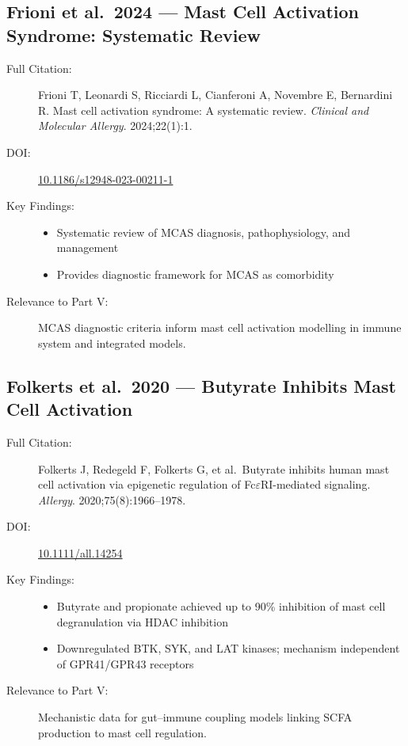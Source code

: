 \subsection{Frioni et al.\ 2024 --- Mast Cell Activation Syndrome: Systematic Review}

\begin{description}
    \item[Full Citation:] Frioni T, Leonardi S, Ricciardi L, Cianferoni A, Novembre E, Bernardini R. Mast cell activation syndrome: A systematic review. \textit{Clinical and Molecular Allergy}. 2024;22(1):1. \cite{Frioni2024MCAS}
    \item[DOI:] \href{https://doi.org/10.1186/s12948-023-00211-1}{10.1186/s12948-023-00211-1}
    \item[Key Findings:]
    \begin{itemize}
        \item Systematic review of MCAS diagnosis, pathophysiology, and management
        \item Provides diagnostic framework for MCAS as comorbidity
    \end{itemize}
    \item[Relevance to Part V:] MCAS diagnostic criteria inform mast cell activation modelling in immune system and integrated models.
\end{description}

\subsection{Folkerts et al.\ 2020 --- Butyrate Inhibits Mast Cell Activation}

\begin{description}
    \item[Full Citation:] Folkerts J, Redegeld F, Folkerts G, et al.\ Butyrate inhibits human mast cell activation via epigenetic regulation of Fc$\varepsilon$RI-mediated signaling. \textit{Allergy}. 2020;75(8):1966--1978. \cite{Folkerts2020butyrate}
    \item[DOI:] \href{https://doi.org/10.1111/all.14254}{10.1111/all.14254}
    \item[Key Findings:]
    \begin{itemize}
        \item Butyrate and propionate achieved up to 90\% inhibition of mast cell degranulation via HDAC inhibition
        \item Downregulated BTK, SYK, and LAT kinases; mechanism independent of GPR41/GPR43 receptors
    \end{itemize}
    \item[Relevance to Part V:] Mechanistic data for gut--immune coupling models linking SCFA production to mast cell regulation.
\end{description}

